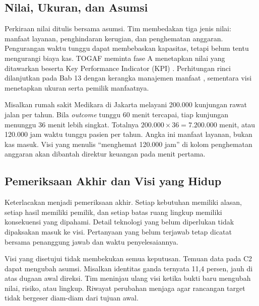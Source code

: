 \subsection*{Nilai, Ukuran, dan Asumsi}

Perkiraan nilai ditulis bersama asumsi. Tim membedakan tiga jenis nilai: manfaat
layanan, penghindaran kerugian, dan penghematan anggaran. Pengurangan waktu tunggu
dapat membebaskan kapasitas, tetapi belum tentu mengurangi biaya kas. TOGAF meminta
fase A menetapkan nilai yang ditawarkan beserta Key Performance Indicator (KPI)
\cite{togaf10}. Perhitungan
rinci dilanjutkan pada Bab 13 dengan kerangka manajemen manfaat \cite{ward2012},
sementara visi menetapkan ukuran serta pemilik manfaatnya.

Misalkan rumah sakit Medikara di Jakarta melayani 200.000 kunjungan rawat jalan per
tahun. Bila \textit{outcome} tunggu 60 menit tercapai, tiap kunjungan menunggu 36
menit lebih singkat. Totalnya $200.000 \times 36 = 7.200.000$ menit, atau 120.000 jam
waktu tunggu pasien per tahun. Angka ini manfaat layanan, bukan kas masuk. Visi yang
menulis ``menghemat 120.000 jam'' di kolom penghematan anggaran akan dibantah
direktur keuangan pada menit pertama.

\subsection*{Pemeriksaan Akhir dan Visi yang Hidup}

Keterlacakan menjadi pemeriksaan akhir. Setiap kebutuhan memiliki alasan, setiap
hasil memiliki pemilik, dan setiap batas ruang lingkup memiliki konsekuensi yang
dipahami. Detail teknologi yang belum diperlukan tidak dipaksakan masuk ke visi.
Pertanyaan yang belum terjawab tetap dicatat bersama penanggung jawab dan waktu
penyelesaiannya.

Visi yang disetujui tidak membekukan semua keputusan. Temuan data pada C2 dapat
mengubah asumsi. Misalkan identitas ganda ternyata 11,4 persen, jauh di atas dugaan
awal direksi. Tim meninjau ulang visi ketika bukti baru mengubah nilai, risiko, atau
lingkup. Riwayat perubahan menjaga agar rancangan target tidak bergeser diam-diam
dari tujuan awal.


